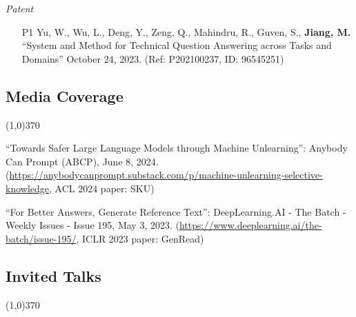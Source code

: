 \documentclass[10pt]{article}
\newenvironment{myindentpar}[1]%
{\begin{list}{}%
         {\setlength{\leftmargin}{#1}}%
         \item[]%
}
{\end{list}}
\newcounter{list}
\begin{document}
\begin{myindentpar}{0.00cm}
\hspace{-0.25cm}\textit{Patent}

\begin{enumerate}[leftmargin=.5cm]

\item[P1] Yu, W., Wu, L., Deng, Y., Zeng, Q., Mahindru, R., Guven, S., \textbf{Jiang, M.} ``System and Method for Technical Question Answering across Tasks and Domains'' October 24, 2023. (Ref: P202100237, ID: 96545251)

\end{enumerate}


\end{myindentpar}

\subsection{\sc Media Coverage}
\vspace{-0.4cm} \line(1,0){370} \vspace{-0.1cm}

\begin{myindentpar}{0.75cm}

\hspace{-0.75cm} ``Towards Safer Large Language Models through Machine Unlearning'': Anybody Can Prompt (ABCP), June 8, 2024. (\url{https://anybodycanprompt.substack.com/p/machine-unlearning-selective-knowledge}, ACL 2024 paper: SKU)

\hspace{-0.75cm} ``For Better Answers, Generate Reference Text'': DeepLearning.AI - The Batch - Weekly Issues - Issue 195, May 3, 2023. (\url{https://www.deeplearning.ai/the-batch/issue-195/}, ICLR 2023 paper: GenRead)

\end{myindentpar}

\subsection{\sc Invited Talks}
\vspace{-0.4cm} \line(1,0){370} \vspace{-0.1cm}
\end{document}
